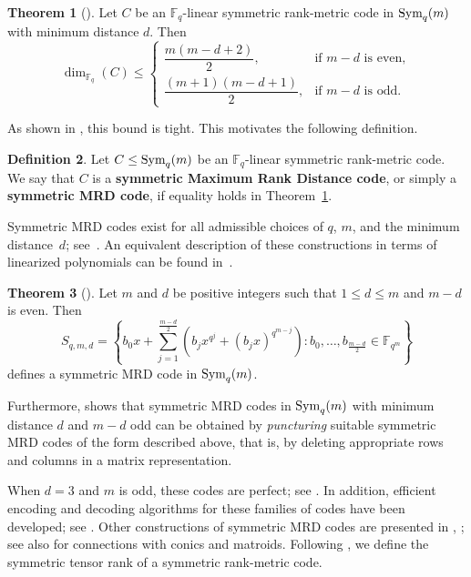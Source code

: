 \documentclass[11pt,a4paper,reqno]{article}
\numberwithin{equation}{section}
\theoremstyle{definition}
\newtheorem{theorem}{Theorem}[section]
\newtheorem{definition}[theorem]{Definition}
\newcommand{\Sym}{{\textnormal{Sym}}}
\begin{document}
\begin{theorem}[]\label{thm:SingletonBound}
Let \(C\) be an \(\mathbb F_q\)-linear symmetric rank-metric code in
\(\Sym_q(m)\) with minimum distance \(d\). Then
\[
\dim_{\mathbb F_q}(C) \le
\begin{cases}
\dfrac{m(m-d+2)}{2}, & \text{if \(m-d\) is even},\\[1ex]
\dfrac{(m+1)(m-d+1)}{2}, & \text{if \(m-d\) is odd}.
\end{cases}
\]
\end{theorem}

As shown in \cite{schmidt2015symmetric}, this bound is tight. This motivates the following definition.

\begin{definition}
Let \(C\leq \Sym_q(m)\) be an \(\mathbb F_q\)-linear symmetric rank-metric code. We say that \(C\) is a \textbf{symmetric Maximum Rank Distance code},
or simply a \textbf{symmetric MRD code}, if equality holds in
Theorem~\ref{thm:SingletonBound}.
\end{definition}

Symmetric MRD codes exist for all admissible choices of \(q\), \(m\), and the minimum distance~\(d\); see~\cite[Theorem 4.4]{schmidt2015symmetric}. An equivalent description of these constructions in terms of linearized polynomials can be found in~\cite{longobardi2020automorphism}.

\begin{theorem}[]\label{Th-Schmidt-4.4}
Let \(m\) and \(d\) be positive integers such that \(1\le d\le m\) and
\(m-d\) is even. Then
\[
S_{q,m,d}=
\left\{
b_0x+
\sum_{j=1}^{\frac{m-d}{2}}
\left(
b_jx^{q^j}+(b_jx)^{q^{m-j}}
\right)
:
b_0,\ldots,b_{\frac{m-d}{2}}\in \mathbb F_{q^m}
\right\}
\]
defines a symmetric MRD code in \(\Sym_q(m)\).
\end{theorem}

Furthermore, \cite[Theorem~4.1]{schmidt2015symmetric} shows that symmetric
MRD codes in \(\Sym_q(m)\) with minimum distance \(d\) and \(m-d\) odd can be
obtained by \textit{puncturing} suitable symmetric MRD codes of the form described above, that is, by deleting appropriate rows and columns in a matrix representation.

When \(d=3\) and \(m\) is odd, these codes are perfect; see
\cite{mushrraf2025perfect}. In addition, efficient encoding and decoding
algorithms for these families of codes have been developed; see
\cite{gabidulin2002representation,gabidulin2004symmetric,
gabidulin2006symmetric,kadir2022encoding}. Other constructions of symmetric MRD codes are presented in
\cite[Section~5]{longobardi2020automorphism},
\cite{zhou2020equivalence,bik2024higher,tang2026new}; see also
\cite{byrne2026q,alnajjarine2026linear} for connections with conics and
matroids. Following \cite{byrne2019tensor,byrne2023tensor}, we define the symmetric
tensor rank of a symmetric rank-metric code.
\end{document}
